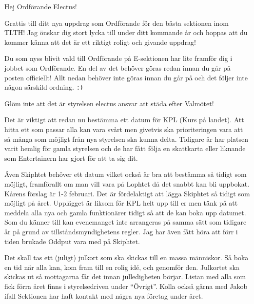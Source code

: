 \documentclass[10pt]{article}
\begin{document}
    \heading{\doctitle}
    
    Hej Ordförande Electus!
    
    Grattis till ditt nya uppdrag som Ordförande för den bästa sektionen inom TLTH! Jag önskar dig stort lycka till under ditt kommande år och hoppas att du kommer känna att det är ett riktigt roligt och givande uppdrag!
    
    Du som nyss blivit vald till Ordförande på E-sektionen har lite framför dig i jobbet som Ordförande. En del av det behöver göras redan innan du går på posten officiellt! Allt nedan behöver inte göras innan du går på och det följer inte någon särskild ordning. \texttt{:)}
    
    \begin{numplist}
     \item Glöm inte att det är styrelsen electus ansvar att städa efter Valmötet!
    
    \item Det är viktigt att redan nu bestämma ett datum för KPL (Kurs på landet). Att hitta ett som passar alla kan vara svårt men givetvis ska prioriteringen vara att så många som möjligt från nya styrelsen ska kunna delta. Tidigare år har platsen varit hemlig för gamla styrelsen och de har fått följa en skattkarta eller liknande som Entertainern har gjort för att ta sig dit. 
    
    \item Även Skiphtet behöver ett datum vilket också är bra att bestämma så tidigt som möjligt, framförallt om man vill vara på Lophtet då det snabbt kan bli uppbokat. Kårens förslag är 1-2 februari. Det är fördelaktigt att lägga Skiphtet så tidigt som möjligt på året. Upplägget är liksom för KPL helt upp till er men tänk på att meddela alla nya och gamla funktionärer tidigt så att de kan boka upp datumet. Som du känner till kan evenemanget inte arrangeras på samma sätt som tidigare år på grund av tillståndsmyndighetens regler. Jag har även fått höra att förr i tiden brukade Oddput vara med på Skiphtet.

    \item Det skall tas ett (juligt) julkort som ska skickas till en massa människor. Så boka en tid när alla kan, kom fram till en rolig idé, och genomför den. Julkortet ska skickas ut så mottagarna får det innan julledigheten börjar. Listan med alla som fick förra året finns i styrelsedriven under “Övrigt”. Kolla också gärna med Jakob ifall  Sektionen har haft kontakt med några nya företag under året.   
    

\end{numplist}
\end{document}

